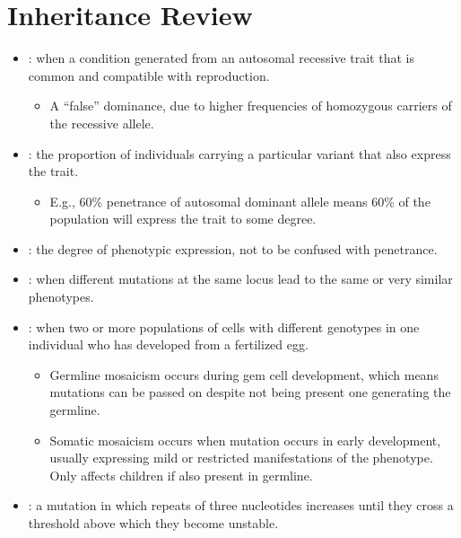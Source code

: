 \documentclass{inVerba-notes}
\begin{document}
\section{Inheritance Review}\label{Inhertiance Review}
\begin{itemize}
    \item {}: when a condition generated from an autosomal recessive trait that is common and compatible with reproduction.
      \begin{itemize}
        \item A ``false'' dominance, due to higher frequencies of homozygous carriers of the recessive allele.
      \end{itemize}
    \item {}: the proportion of individuals carrying a particular variant that also express the trait.
      \begin{itemize}
        \item E.g., 60\% penetrance of autosomal dominant allele means 60\% of the population will express the trait to some degree.
      \end{itemize}
    \item {}: the degree of phenotypic expression, not to be confused with penetrance. 
    \item {}: when different mutations at the same locus lead to the same or very similar phenotypes. 
    \item {}: when two or more populations of cells with different genotypes in one individual who has developed from a fertilized egg.
      \begin{itemize}
        \item Germline mosaicism occurs during gem cell development, which means mutations can be passed on despite not being present one generating the germline.
        \item Somatic mosaicism occurs when mutation occurs in early development, usually expressing mild or restricted manifestations of the phenotype. Only affects children if also present in germline.
      \end{itemize}
    \item {}: a mutation in which repeats of three nucleotides increases until they cross a threshold above which they become unstable.
\end{itemize}


\end{document}
